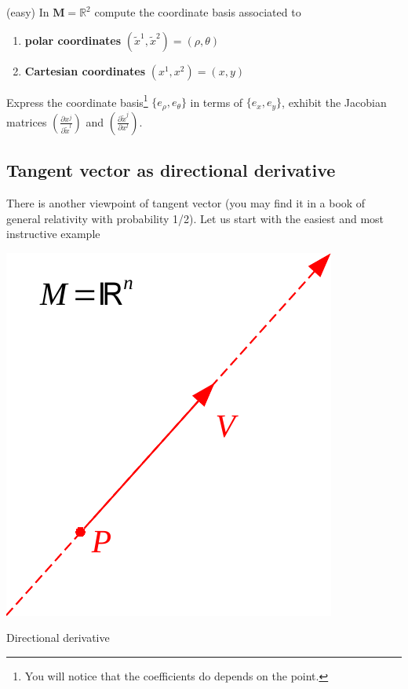 \documentclass[../main.tex]{subfiles}
\begin{document}
\begin{example}(easy)
In $\mathbf{M}=\mathbb{R}^2$ compute the coordinate basis associated to
\begin{enumerate}
    \item \textbf{polar coordinates} $(\tilde{x}^1,\tilde{x}^2)=(\rho,\theta)$
    \item \textbf{Cartesian coordinates} $(x^1,x^2)=(x,y)$
\end{enumerate}
Express the coordinate basis\footnote{You will notice that the coefficients do depends on the point.} $\{e_{\rho},e_{\theta}\}$ in terms of $\{e_x,e_y\}$, exhibit the Jacobian matrices $\left(\frac{\partial x^j}{\partial\tilde{x}^l}\right)$ and $\left(\frac{\partial\tilde{x}^j}{\partial x^l}\right)$.
\end{example}
\subsection{Tangent vector as directional derivative}
There is another viewpoint of tangent vector (you may find it in a book of general relativity with probability 1/2). Let us start with the easiest and most instructive example
\begin{marginfigure}
	\includegraphics{images/direc_der.pdf}
	\caption[Directional derivative]{Directional derivative}
\end{marginfigure}
\end{document}
